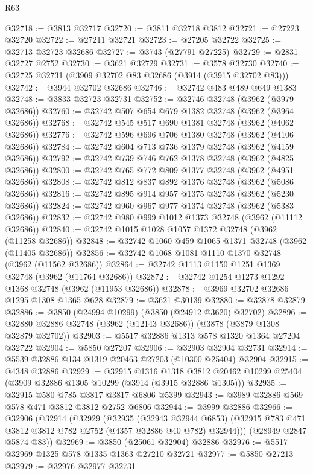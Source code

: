 \begin{lexlean}{R63}
\begin{coremodule}
@32718 := @3813 @32717
@32720 := @3811 @32718 @3812
@32721 := @27223 @32720
@32722 := @27211 @32721
@32723 := @27205 @32722
@32725 := @32713 @32723 @32686
@32727 := @3743 (@27791 @27225)
@32729 := @2831 @32727 @2752
@32730 := @3621 @32729
@32731 := @3578 @32730
@32740 := @32725 @32731 (@3909 @32702 @83 @32686 (@3914 (@3915 @32702 @83)))
@32742 := @3944 @32702 @32686
@32746 := @32742 @483 @489 @649 @1383
@32748 := @3833 @32723 @32731
@32752 := @32746 @32748 (@3962 (@3979 @32686))
@32760 := @32742 @507 @654 @679 @1382 @32748 (@3962 (@3964 @32686))
@32768 := @32742 @545 @517 @690 @1381 @32748 (@3962 (@4062 @32686))
@32776 := @32742 @596 @696 @706 @1380 @32748 (@3962 (@4106 @32686))
@32784 := @32742 @604 @713 @736 @1379 @32748 (@3962 (@4159 @32686))
@32792 := @32742 @739 @746 @762 @1378 @32748 (@3962 (@4825 @32686))
@32800 := @32742 @765 @772 @809 @1377 @32748 (@3962 (@4951 @32686))
@32808 := @32742 @812 @837 @892 @1376 @32748 (@3962 (@5086 @32686))
@32816 := @32742 @895 @914 @957 @1375 @32748 (@3962 (@5230 @32686))
@32824 := @32742 @960 @967 @977 @1374 @32748 (@3962 (@5383 @32686))
@32832 := @32742 @980 @999 @1012 @1373 @32748 (@3962 (@11112 @32686))
@32840 := @32742 @1015 @1028 @1057 @1372 @32748 (@3962 (@11258 @32686))
@32848 := @32742 @1060 @459 @1065 @1371 @32748 (@3962 (@11405 @32686))
@32856 := @32742 @1068 @1081 @1110 @1370 @32748 (@3962 (@11562 @32686))
@32864 := @32742 @1113 @1150 @1251 @1369 @32748 (@3962 (@11764 @32686))
@32872 := @32742 @1254 @1273 @1292 @1368 @32748 (@3962 (@11953 @32686))
@32878 := @3969 @32702 @32686 @1295 @1308 @1365 @628
@32879 := @3621 @30139
@32880 := @32878 @32879
@32886 := @3850 (@24994 @10299) (@3850 (@24912 @3620) @32702)
@32896 := @32880 @32886 @32748 (@3962 (@12143 @32686)) (@3878 (@3879 @1308 @32879 @32702))
@32903 := @5517 @32886 @1313 @578 @1320 @1364 @27204 @32722
@32904 := @5850 @27207
@32906 := @32903 @32904 @32731
@32914 := @5539 @32886 @134 @1319 @20463 @27203 (@10300 @25404) @32904
@32915 := @4348 @32886
@32929 := @32915
    @1316
    @1318
    @3812
    @20462
    @10299
    @25404
    (@3909 @32886 @1305 @10299 (@3914 (@3915 @32886 @1305)))
@32935 := @32915 @580 @785 @3817 @3817 @6806 @5399
@32943 := @3989 @32886 @569 @578 @471 @3812 @3812 @2752 @6806
@32944 := @3999 @32886
@32966 := @32906
    (@32914
      (@32929
        (@32935
          (@32943 @32944 @6853)
          (@32915 @783 @471 @3812 @3812 @782 @2752 (@4357 @32886 @40 @782) @32944)))
      (@28949 @2847 @5874 @83))
@32969 := @3850 (@25061 @32904) @32886
@32976 := @5517 @32969 @1325 @578 @1335 @1363 @27210 @32721
@32977 := @5850 @27213
@32979 := @32976 @32977 @32731

\end{coremodule}
\end{lexlean}

